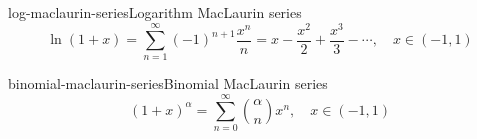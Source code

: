 \documentclass[preview]{standalone}
\begin{document}
\begin{snippetproposition}{log-maclaurin-series}{Logarithm MacLaurin series}
    \[
        \ln(1 + x) = \sum_{n=1}^\infty {(-1)}^{n+1}\frac{x^n}{n}
        = x - \frac{x^2}{2} + \frac{x^3}{3} - \cdots, \quad x\in(-1,1)
    \]
\end{snippetproposition}

\begin{snippetproposition}{binomial-maclaurin-series}{Binomial MacLaurin series}
    \[
        {(1 + x)}^\alpha = \sum_{n=0}^\infty \binom{\alpha}{n}x^n, \quad x\in(-1,1)
    \]
\end{snippetproposition}
\end{document}
